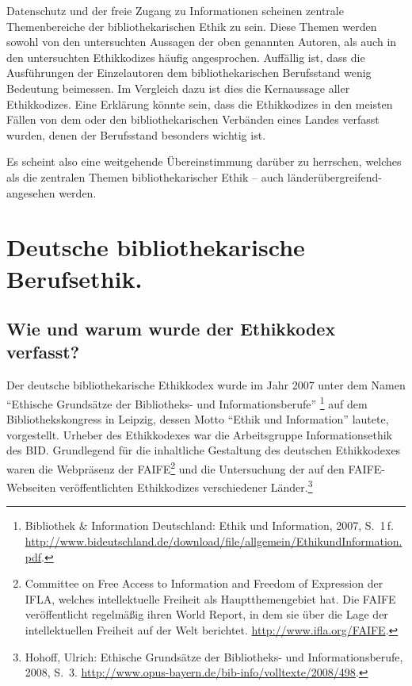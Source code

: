 \documentclass[output=paper]{langscibook}
\begin{document}
Datenschutz und der freie Zugang zu Informationen scheinen zentrale
Themenbereiche der bibliothekarischen Ethik zu sein. Diese Themen werden
sowohl von den untersuchten Aussagen der oben genannten Autoren, als
auch in den untersuchten Ethikkodizes häufig angesprochen. Auffällig
ist, dass die Ausführungen der Einzelautoren dem bibliothekarischen
Berufsstand wenig Bedeutung beimessen. Im Vergleich dazu ist dies die
Kernaussage aller Ethikkodizes. Eine Erklärung könnte sein, dass die
Ethikkodizes in den meisten Fällen von dem oder den bibliothekarischen
Verbänden eines Landes verfasst wurden, denen der Berufsstand besonders
wichtig ist.

Es scheint also eine weitgehende Übereinstimmung darüber zu herrschen,
welches als die zentralen Themen bibliothekarischer Ethik -- auch
länderübergreifend- angesehen werden.

\hypertarget{deutsche-bibliothekarische-berufsethik.}{%
\section*{Deutsche bibliothekarische
Berufsethik.}\label{deutsche-bibliothekarische-berufsethik.}}

\hypertarget{wie-und-warum-wurde-der-ethikkodex-verfasst}{%
\subsection*{Wie und warum wurde der Ethikkodex
verfasst?}\label{wie-und-warum-wurde-der-ethikkodex-verfasst}}

Der deutsche bibliothekarische Ethikkodex wurde im Jahr 2007 unter dem
Namen \enquote{Ethische Grundsätze der Bibliotheks- und
Informationsberufe} \footnote{Bibliothek \& Information Deutschland:
  Ethik und Information, 2007, S.~1\,f.
  \url{http://www.bideutschland.de/download/file/allgemein/EthikundInformation.pdf}.}
auf dem Bibliothekskongress in Leipzig, dessen Motto \enquote{Ethik und
Information} lautete, vorgestellt. Urheber des Ethikkodexes war die
Arbeitsgruppe Informationsethik des BID. Grundlegend für die inhaltliche
Gestaltung des deutschen Ethikkodexes waren die Webpräsenz der
FAIFE\footnote{Committee on Free Access to Information and Freedom of
  Expression der IFLA, welches intellektuelle Freiheit als
  Hauptthemengebiet hat. Die FAIFE veröffentlicht regelmäßig ihren World
  Report, in dem sie über die Lage der intellektuellen Freiheit auf der
  Welt berichtet. \url{http://www.ifla.org/FAIFE}.} und die Untersuchung
der auf den FAIFE-Webseiten veröffentlichten Ethikkodizes verschiedener
Länder.\footnote{Hohoff, Ulrich: Ethische Grundsätze der Bibliotheks- und Informationsberufe, 2008, S.~3.
  \url{http://www.opus-bayern.de/bib-info/volltexte/2008/498}.}
\end{document}
